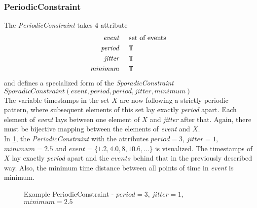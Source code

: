 	\subsubsection{PeriodicConstraint}
		The \emph{PeriodicConstraint} takes 4 attribute
		\begin{align*}
			\emph{event} 	& \hspace{.5cm}\text{set of events}\\
			\emph{period} 	& \hspace{.5cm}\mathbb{T}\\
			\emph{jitter}	& \hspace{.5cm}\mathbb{T}\\
			\emph{minimum}	& \hspace{.5cm}\mathbb{T}
		\end{align*}
		and defines a specialized form of the \emph{SporadicConstraint}\\[10pt]
		\begin{math}
			SporadicConstraint(event, period, period, jitter, minimum)
		\end{math}\\[10pt]
		The variable timestamps in the set $X$ are now following a strictly periodic pattern, where subsequent elements of this set lay exactly \emph{period} apart. Each element of \emph{event} lays between one element of $X$ and \emph{jitter} after that. Again, there must be bijective mapping between the elements of \emph{event} and $X$.\\
		In \ref{fig:PeriodicConstraintExample}, the \emph{PeriodicConstraint} with the attributes $period=3$, $jitter=1$, $minimum=2.5$ and $event = \{1.2, 4.0, 8, 10.6, ...\}$ is visualized. The timestamps of $X$ lay exactly \emph{period} apart and the $events$ behind that in the previously described way. Also, the minimum time distance between all points of time in \emph{event} is minimum.
		\begin{figure}
			\caption{Example PeriodicConstraint - $period=3$, $jitter=1$, $minimum=2.5$}
			\label{fig:PeriodicConstraintExample}
		\end{figure}
		

